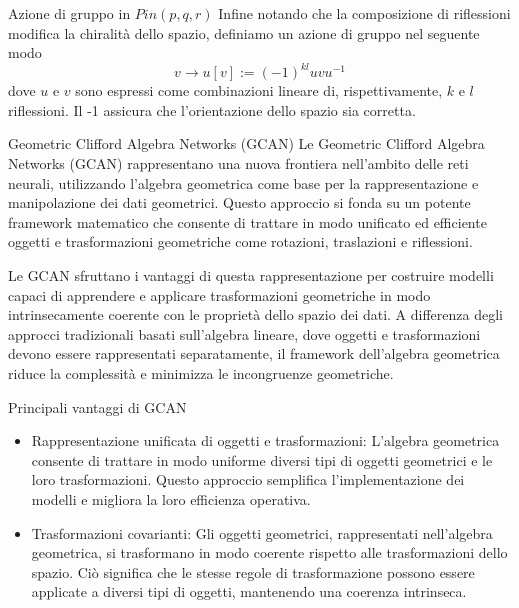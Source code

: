 \begin{frame}{Azione di gruppo in \(Pin(p,q,r)\)}
   Infine notando che la composizione di riflessioni modifica la chiralità  dello spazio, definiamo un azione di gruppo nel seguente modo
   \begin{equation}
      v \to u[v]:=(-1)^{kl}uvu^{-1}
   \end{equation}
   dove \(u\) e \(v\) sono espressi come combinazioni lineare di, rispettivamente, \(k\) e \(l\) riflessioni. Il -1 assicura che l’orientazione dello spazio sia corretta.
   
\end{frame}

\begin{frame}{Geometric Clifford Algebra Networks (GCAN)}
   Le Geometric Clifford Algebra Networks (GCAN) rappresentano una nuova frontiera nell’ambito delle reti neurali, utilizzando l’algebra geometrica come base per la rappresentazione e manipolazione dei dati geometrici. 
   Questo approccio si fonda su un potente framework matematico che consente di trattare in modo unificato ed efficiente oggetti e trasformazioni geometriche come rotazioni, traslazioni e riflessioni.
\end{frame}

\begin{frame}
    Le GCAN sfruttano i vantaggi di questa rappresentazione per costruire modelli capaci di apprendere e applicare trasformazioni geometriche in modo intrinsecamente coerente con le proprietà dello spazio dei dati. 
   A differenza degli approcci tradizionali basati sull’algebra lineare, dove oggetti e trasformazioni devono essere rappresentati separatamente, il framework dell’algebra geometrica riduce la complessità e minimizza le incongruenze geometriche.
\end{frame}

\begin{frame}{Principali vantaggi di GCAN}
   \begin{itemize}
      \item Rappresentazione unificata di oggetti e trasformazioni: 
      L’algebra geometrica consente di trattare in modo uniforme diversi tipi di oggetti geometrici e le loro trasformazioni. Questo approccio semplifica l’implementazione dei modelli e migliora la loro efficienza operativa.
      
      \item Trasformazioni covarianti: 
      Gli oggetti geometrici, rappresentati nell’algebra geometrica, si trasformano in modo coerente rispetto alle trasformazioni dello spazio. Ciò significa che le stesse regole di trasformazione possono essere applicate a diversi tipi di oggetti, mantenendo una coerenza intrinseca.
   \end{itemize}
\end{frame}

